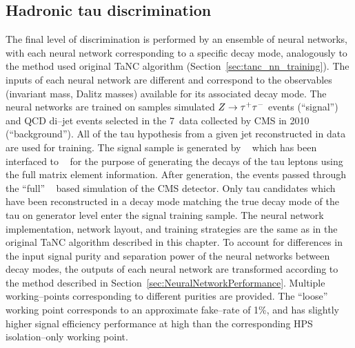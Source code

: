 \subsection{Hadronic tau discrimination}
%
The final level of discrimination is performed by an ensemble of neural
networks, with each neural network corresponding to a specific decay mode,
analogously to the method used original TaNC algorithm
(Section~\ref{sec:tanc_nn_training}).  The inputs of each neural network are
different and correspond to the observables (invariant mass, Dalitz masses)
available for its associated decay mode.  The neural networks are trained on
samples simulated $Z \to \tau^+\tau^-$ events (``signal'') and QCD di--jet events
selected in the 7~\TeV data collected by CMS in 2010 (``background'').  All of
the tau hypothesis from a given jet reconstructed in data are used for training.
The \ZTT signal sample is generated by \PYTHIA~\cite{pythia6_4} which has been
interfaced to \TAUOLA~\cite{tauola} for the purpose of generating the decays of
the tau leptons using the full matrix element information.  After generation,
the events passed through the ``full'' \GEANT~\cite{geant} based simulation of
the CMS detector.  Only tau candidates which have been reconstructed in a decay
mode matching the true decay mode of the tau on generator level enter the signal
training sample.  The neural network implementation, network layout, and
training strategies are the same as in the original TaNC algorithm described in
this chapter.  To account for differences in the input signal purity and
separation power of the neural networks between decay modes, the outputs of each
neural network are transformed according to the method described in
Section~\ref{sec:NeuralNetworkPerformance}.  Multiple working--points
corresponding to different purities are provided.  The ``loose'' working point
corresponds to an approximate fake--rate of 1\%, and has slightly higher signal
efficiency performance at high \pt than the corresponding HPS isolation--only
working point.

